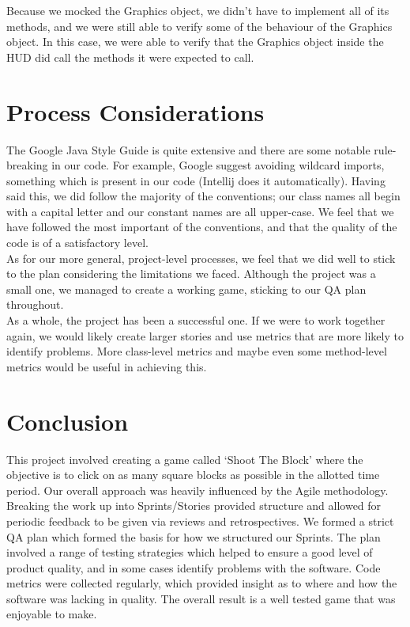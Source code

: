 \documentclass[12pt]{article}
\begin{document}
Because we mocked the Graphics object, we didn't have to implement all of its methods, and we were still able to verify some of the behaviour of the Graphics object. In this case, we were able to verify that the Graphics object inside the HUD did call the methods it were expected to call.

\section{Process Considerations}

The Google Java Style Guide is quite extensive and there are some notable rule-breaking in our code. For example, Google suggest avoiding wildcard imports, something which is present in our code (Intellij does it automatically). Having said this, we did follow the majority of the conventions; our class names all begin with a capital letter and our constant names are all upper-case. We feel that we have followed the most important of the conventions, and that the quality of the code is of a satisfactory level. \\

As for our more general, project-level processes, we feel that we did well to stick to the plan considering the limitations we faced. Although the project was a small one, we managed to create a working game, sticking to our QA plan throughout. \\

As a whole, the project has been a successful one. If we were to work together again, we would likely create larger stories and use metrics that are more likely to identify problems. More class-level metrics and maybe even some method-level metrics would be useful in achieving this.

\section{Conclusion}

This project involved creating a game called `Shoot The Block' where the objective is to click on as many square blocks as possible in the allotted time period. Our overall approach was heavily influenced by the Agile methodology. Breaking the work up into Sprints/Stories provided structure and allowed for periodic feedback to be given via reviews and retrospectives. We formed a strict QA plan which formed the basis for how we structured our Sprints. The plan involved a range of testing strategies which helped to ensure a good level of product quality, and in some cases identify problems with the software. Code metrics were collected regularly, which provided insight as to where and how the software was lacking in quality. The overall result is a well tested game that was enjoyable to make.
\end{document}
